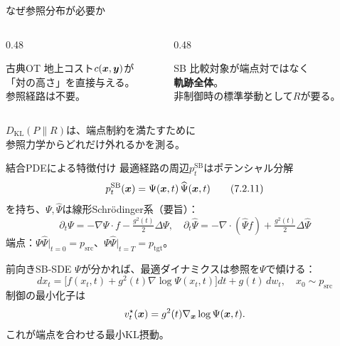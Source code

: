 \asmain
\begin{frame}{なぜ参照分布が必要か}
    \begin{columns}[T,onlytextwidth]
        \begin{column}{0.48\textwidth}
            \begin{block}{古典OT}
                地上コスト$c(\bm{x},\bm{y})$が\\
                「対の高さ」を直接与える。\\
                参照経路は不要。
            \end{block}
        \end{column}
        \begin{column}{0.48\textwidth}
            \begin{block}{SB}
                比較対象が端点対ではなく\\
                \textbf{軌跡全体}。\\
                非制御時の標準挙動として$R$が要る。
            \end{block}
        \end{column}
    \end{columns}
    \vspace{0.4em}
    $D_{\mathrm{KL}}(P\|R)$は、端点制約を満たすために\\
    参照力学からどれだけ外れるかを測る。
\end{frame}
\asmain
\begin{frame}{結合PDEによる特徴付け}
    最適経路の周辺$p_{t}^{\mathrm{SB}}$はポテンシャル分解
    \[
        p_{t}^{\mathrm{SB}}(\bm{x})
        =
        \Psi(\bm{x},t)\,\widehat{\Psi}(\bm{x},t)
        \tag{7.2.11}
    \]
    を持ち、$\Psi,\widehat{\Psi}$は線形Schrödinger系（要旨）：
    \[
        \partial_{t}\Psi
        =
        -\nabla\Psi\cdot f
        -
        \tfrac{g^{2}(t)}{2}\Delta\Psi,
        \quad
        \partial_{t}\widehat{\Psi}
        =
        -\nabla\cdot(\widehat{\Psi}f)
        +
        \tfrac{g^{2}(t)}{2}\Delta\widehat{\Psi}
        \tag{7.2.12}
    \]
    端点：$\Psi\widehat{\Psi}|_{t=0}=p_{\mathrm{src}}$、$\Psi\widehat{\Psi}|_{t=T}=p_{\mathrm{tgt}}$。
\end{frame}
\asmain
\begin{frame}{前向きSB-SDE}
    $\Psi$が分かれば、最適ダイナミクスは参照を$\Psi$で傾ける：
    \[
        dx_{t}
        =
        \bigl[
        f(x_{t},t)
        +
        g^{2}(t)\nabla\log\Psi(x_{t},t)
        \bigr]dt
        +
        g(t)\,dw_{t},
        \quad
        x_{0}\sim p_{\mathrm{src}}
        \tag{7.2.13}
    \]
    制御の最小化子は
    \[
        v_{t}^{\star}(\bm{x})=g^{2}(t)\nabla_{\bm{x}}\log\Psi(\bm{x},t).
    \]
    これが端点を合わせる最小KL摂動。
\end{frame}
